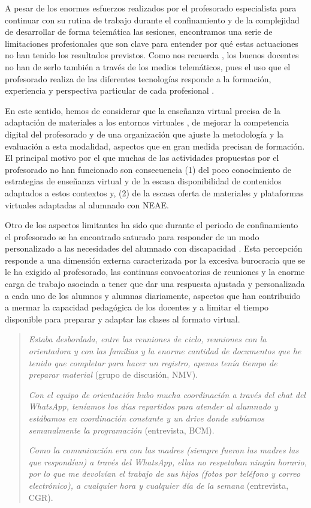 \documentclass[spanish]{textolivre}
\begin{document}
A pesar de los enormes esfuerzos realizados por el profesorado especialista para continuar con su rutina de trabajo durante el confinamiento y de la complejidad de desarrollar de forma telemática las sesiones, encontramos una serie de limitaciones profesionales que son clave para entender por qué estas actuaciones no han tenido los resultados previstos. Como nos recuerda \textcite{fernandezdomingues2020}, %
los buenos docentes no han de serlo también a través de los medios telemáticos, pues el uso que el profesorado realiza de las diferentes tecnologías responde a la formación, experiencia y perspectiva particular de cada profesional \cite{marin2020}. %

En este sentido, hemos de considerar que la enseñanza virtual precisa de la adaptación de materiales a los entornos virtuales \cite{berastegui2020}, %
de mejorar la competencia digital del profesorado y de una organización que ajuste la metodología y la evaluación a esta modalidad, aspectos que en gran medida precisan de formación. El principal motivo por el que muchas de las actividades propuestas por el profesorado no han funcionado son consecuencia (1) del poco conocimiento de estrategias de enseñanza virtual y de la escasa disponibilidad de contenidos adaptados a estos contextos \cite{rogero2020} %
y, (2) de la escasa oferta de materiales y plataformas virtuales adaptadas al alumnado con NEAE.

Otro de los aspectos limitantes ha sido que durante el periodo de confinamiento el profesorado se ha encontrado saturado para responder de un modo personalizado a las necesidades del alumnado con discapacidad \cite{vega2020}. %
Esta percepción responde a una dimensión externa caracterizada por la excesiva burocracia que se le ha exigido al profesorado, las continuas convocatorias de reuniones y la enorme carga de trabajo asociada a tener que dar una respuesta ajustada y personalizada a cada uno de los alumnos y alumnas diariamente, aspectos que han contribuido a mermar la capacidad pedagógica de los docentes y a limitar el tiempo disponible para preparar y adaptar las clases al formato virtual. 

\begin{quote}
\emph{Estaba desbordada, entre las reuniones de ciclo, reuniones con la orientadora y con las familias y la enorme cantidad de documentos que he tenido que completar para hacer un registro, apenas tenía tiempo de preparar material} (grupo de discusión, NMV).

\emph{Con el equipo de orientación hubo mucha coordinación a través del chat del WhatsApp, teníamos los días repartidos para atender al alumnado y estábamos en coordinación constante y un drive donde subíamos semanalmente la programación} (entrevista, BCM).

\emph{Como la comunicación era con las madres (siempre fueron las madres las que respondían) a través del WhatsApp, ellas no respetaban ningún horario, por lo que me devolvían el trabajo de sus hijos (fotos por teléfono y correo electrónico), a cualquier hora y cualquier día de la semana} (entrevista, CGR).
\end{quote}
\end{document}
